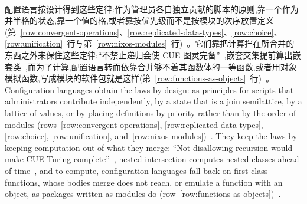 \begin{CJK*}{UTF8}{gbsn}
\paragraph{}
\ifPaperChinese
配置语言按设计得到这些定律:作为管理员各自独立贡献的脚本的原则,靠一个作为并半格的状态,靠一个值的格,或者靠按优先级而不是按模块的次序放置定义(第~\ref{row:convergent-operations}、\ref{row:replicated-data-types}、\ref{row:choice}、\ref{row:unification}~行与第~\ref{row:nixos-modules}~行)~\cite{couch2001-maelstrom, shambaugh2016-rehearsal, shapiro2011-conflict-free-replicated-data-types, dezani1996-filter-models-conjunctive-disjunctive, cue-authors-cue-specification, nixos-contributors-nixos-modules}。它们靠把计算挡在所合并的东西之外来保住这些定律:``不禁止递归会使 CUE 图灵完备''~\cite{cue-authors-code-generation-use-case},嵌套交集提前算出嵌套类~\cite{nystrom2006-nested-intersection},而为了计算,配置语言转而依靠合并够不着其函数体的一等函数,或者用对象模拟函数,写成模块的软件包就是这样(第~\ref{row:functions-as-objects}~行)~\cite{cunningham2014-jsonnet, dolstra2006-purely-functional-deployment, dream2nix-contributors-package-func}。
\else
Configuration languages obtain the laws by design: as principles for scripts that administrators
contribute independently, by a state that is a join semilattice, by a lattice of values, or by placing
definitions by priority rather than by the order of modules
(rows~\ref{row:convergent-operations}, \ref{row:replicated-data-types}, \ref{row:choice},
\ref{row:unification}, and~\ref{row:nixos-modules})~\cite{couch2001-maelstrom, shambaugh2016-rehearsal, shapiro2011-conflict-free-replicated-data-types, dezani1996-filter-models-conjunctive-disjunctive, cue-authors-cue-specification, nixos-contributors-nixos-modules}.
They keep the laws by keeping computation out of what they merge: ``Not disallowing recursion would
make CUE Turing complete''~\cite{cue-authors-code-generation-use-case}, nested intersection computes
nested classes ahead of time~\cite{nystrom2006-nested-intersection}, and to compute, configuration
languages fall back on first-class functions, whose bodies merge does not reach, or emulate a function
with an object, as packages written as modules do
(row~\ref{row:functions-as-objects})~\cite{cunningham2014-jsonnet, dolstra2006-purely-functional-deployment, dream2nix-contributors-package-func}.
\fi



\end{CJK*}
